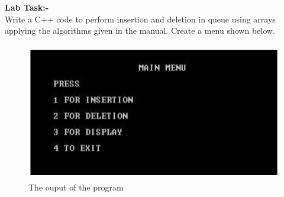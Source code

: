 \documentclass[11pt]{article}            %
\begin{document}
\textbf{Lab Task:-}\\
Write a C++ code to perform insertion and deletion in queue using arrays applying
the algorithms given in the manual. Create a menu shown below.\\
\begin{figure}[H]
\centering
  \includegraphics[width=12cm,height=6cm,keepaspectratio]{2.png}
\caption{The ouput of the program}
\label{Figure:1}    
\end{figure}
\end{document}
